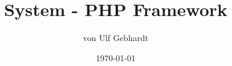 \documentclass{beamer}
\title{System - PHP Framework}
\author{von Ulf Gebhardt}
\institute{\href{mailto:ulf.gebhardt@webcraft-media.de}{ulf.gebhardt@webcraft-media.de}}
\date{\today}
\begin{document}
\frame{\titlepage}







\appendix



\end{document}

